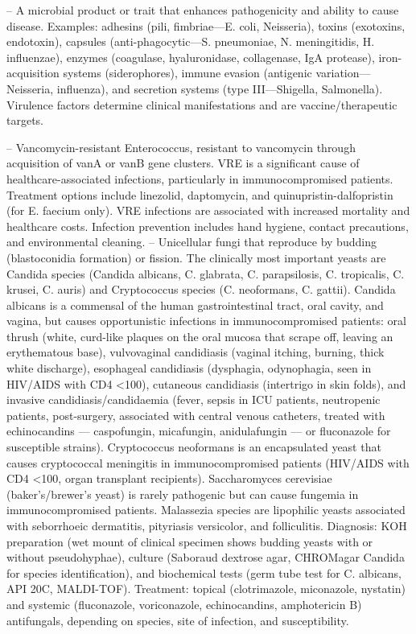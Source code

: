 -- A microbial product or trait that enhances pathogenicity and ability to cause disease. Examples: adhesins (pili, fimbriae—E. coli, Neisseria), toxins (exotoxins, endotoxin), capsules (anti-phagocytic—S. pneumoniae, N. meningitidis, H. influenzae), enzymes (coagulase, hyaluronidase, collagenase, IgA protease), iron-acquisition systems (siderophores), immune evasion (antigenic variation—Neisseria, influenza), and secretion systems (type III—Shigella, Salmonella). Virulence factors determine clinical manifestations and are vaccine/therapeutic targets.

-- Vancomycin-resistant Enterococcus, resistant to vancomycin through acquisition of vanA or vanB gene clusters. VRE is a significant cause of healthcare-associated infections, particularly in immunocompromised patients. Treatment options include linezolid, daptomycin, and quinupristin-dalfopristin (for E. faecium only). VRE infections are associated with increased mortality and healthcare costs. Infection prevention includes hand hygiene, contact precautions, and environmental cleaning.
-- Unicellular fungi that reproduce by budding (blastoconidia formation) or fission. The clinically most important yeasts are Candida species (Candida albicans, C. glabrata, C. parapsilosis, C. tropicalis, C. krusei, C. auris) and Cryptococcus species (C. neoformans, C. gattii). Candida albicans is a commensal of the human gastrointestinal tract, oral cavity, and vagina, but causes opportunistic infections in immunocompromised patients: oral thrush (white, curd-like plaques on the oral mucosa that scrape off, leaving an erythematous base), vulvovaginal candidiasis (vaginal itching, burning, thick white discharge), esophageal candidiasis (dysphagia, odynophagia, seen in HIV/AIDS with CD4 <100), cutaneous candidiasis (intertrigo in skin folds), and invasive candidiasis/candidaemia (fever, sepsis in ICU patients, neutropenic patients, post-surgery, associated with central venous catheters, treated with echinocandins — caspofungin, micafungin, anidulafungin — or fluconazole for susceptible strains). Cryptococcus neoformans is an encapsulated yeast that causes cryptococcal meningitis in immunocompromised patients (HIV/AIDS with CD4 <100, organ transplant recipients). Saccharomyces cerevisiae (baker's/brewer's yeast) is rarely pathogenic but can cause fungemia in immunocompromised patients. Malassezia species are lipophilic yeasts associated with seborrhoeic dermatitis, pityriasis versicolor, and folliculitis. Diagnosis: KOH preparation (wet mount of clinical specimen shows budding yeasts with or without pseudohyphae), culture (Saboraud dextrose agar, CHROMagar Candida for species identification), and biochemical tests (germ tube test for C. albicans, API 20C, MALDI-TOF). Treatment: topical (clotrimazole, miconazole, nystatin) and systemic (fluconazole, voriconazole, echinocandins, amphotericin B) antifungals, depending on species, site of infection, and susceptibility.
